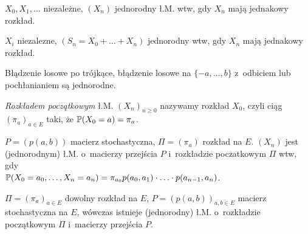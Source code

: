 	\begin{example}
		$X_0, X_1, \ldots$ niezależne, $(X_n)$ jednorodny ł.M.
		wtw, gdy $X_n$ mają jednakowy rozkład.
	\end{example}
	
	\begin{example}
		$X_i$ niezalezne, $(S_n = X_0 + \ldots + X_n)$ jednorodny 
		wtw, gdy $X_n$ mają jednakowy rozkład.
	\end{example}
	
	\begin{example}
		Błądzenie losowe po trójkące, błądzenie losowe na 
		$\{-a, \ldots, b\}$ z~odbiciem lub pochłanianiem
		są jednorodne.
	\end{example}
	
	\begin{definition}
		\emph{Rozkładem początkowym} ł.M. $(X_n)_{n \geq 0}$ nazywamy
		rozkład $X_0$, czyli ciąg $(\pi_a)_{a \in E}$
		taki, że $\P(X_0 = a) = \pi_a$.
	\end{definition}
	
	\begin{fact}
		$P = (p(a,b))$ macierz stochastyczna, $\Pi = (\pi_a)$ 
		rozkład na $E$.
		$(X_n)$ jest (jednorodnym) ł.M. o~macierzy przejścia $P$ 
		i~rozkładzie poczatkowym $\Pi$ wtw, gdy
		\\ $\P(X_0 = a_0, \ldots, X_n = a_n)
			= \pi_{a_0} p(a_0, a_1) \cdot \ldots \cdot p(a_{n-1}, a_n)$.
	\end{fact}
	
	\begin{theorem}[o~istnieniu ł.M.]
		$\Pi = (\pi_a)_{a \in E}$ dowolny rozkład na $E$,
		$P = (p(a,b))_{a,b \in E}$ macierz stochastyczna na $E$,
		wówczas istnieje (jednorodny) ł.M. 
		o~rozkładzie początkowym $\Pi$
		i~macierzy przejścia $P$.
	\end{theorem}








 
 
